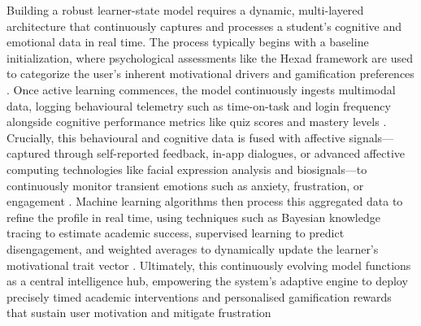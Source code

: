 \documentclass[12pt,a4paper]{article}
\begin{document}
\begin{justify}
Building a robust learner-state model requires a dynamic, multi-layered architecture that continuously captures and processes
a student's cognitive and emotional data in real time. The process typically begins with a baseline initialization, where
psychological assessments like the Hexad framework are used to categorize the user's inherent motivational drivers and
gamification preferences \parencite{shabadurai2025reinforcement,zourmpakis2023adaptive}. Once active learning commences, the model
continuously ingests multimodal data, logging behavioural telemetry such as time-on-task and login frequency alongside
cognitive performance metrics like quiz scores and mastery levels \parencite{naseer2025game}. Crucially, this behavioural
and cognitive data is fused with affective signals—captured through self-reported feedback, in-app dialogues, or 
advanced affective computing technologies like facial expression analysis and biosignals—to continuously monitor transient 
emotions such as anxiety, frustration, or engagement \parencite{naseer2025game,vistorte2024integrating}. Machine learning algorithms 
then process this aggregated data to refine the profile in real time, using techniques such as Bayesian knowledge tracing 
to estimate academic success, supervised learning to predict disengagement, and weighted averages to dynamically update the 
learner's motivational trait vector \parencite{farhan2023machine,naseer2025game,shabadurai2025reinforcement}. Ultimately, this 
continuously evolving model functions as a central intelligence hub, empowering the system's adaptive engine to deploy precisely 
timed academic interventions and personalised gamification rewards that sustain user motivation and mitigate frustration 
\parencite{farhan2023machine,naseer2025game}


\end{justify}
\end{document}
